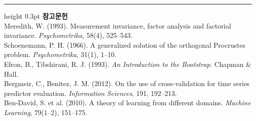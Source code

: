 \documentclass[10pt]{article}
\begin{document}
\vspace{0.6em}
\hrule height 0.3pt
\vspace{0.5em}
{\footnotesize
\textbf{참고문헌}\\[0.3em]
Meredith, W. (1993). Measurement invariance, factor analysis and factorial
invariance. \emph{Psychometrika}, 58(4), 525--543.\\[0.15em]
Schoenemann, P. H. (1966). A generalized solution of the orthogonal Procrustes
problem. \emph{Psychometrika}, 31(1), 1--10.\\[0.15em]
Efron, B., Tibshirani, R. J. (1993). \emph{An Introduction to the Bootstrap}.
Chapman \& Hall.\\[0.15em]
Bergmeir, C., Benitez, J. M. (2012). On the use of cross-validation for time
series predictor evaluation. \emph{Information Sciences}, 191, 192--213.\\[0.15em]
Ben-David, S. et al. (2010). A theory of learning from different domains.
\emph{Machine Learning}, 79(1--2), 151--175.
}
\end{document}
